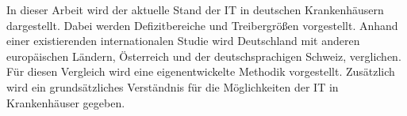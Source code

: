
In dieser Arbeit wird der aktuelle Stand der IT in deutschen Krankenhäusern dargestellt. Dabei werden Defizitbereiche und Treibergrößen vorgestellt. Anhand einer existierenden internationalen Studie wird Deutschland mit anderen europäischen Ländern, Österreich und der deutschsprachigen Schweiz, verglichen. Für diesen Vergleich wird eine eigenentwickelte Methodik vorgestellt. Zusätzlich wird ein grundsätzliches Verständnis für die Möglichkeiten der IT in Krankenhäuser gegeben.